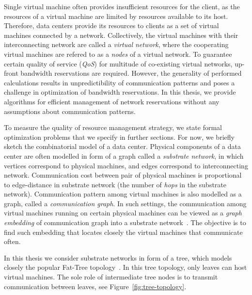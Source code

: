 Single virtual machine often provides insufficient resources for the client, as the resources of a virtual machine are limited by resources available to its host.
Therefore, data centers provide its resources to clients as a set
of virtual machines connected by a network.
Collectively, the virtual machines with their interconnecting network are called a \emph{virtual network}, where the cooperating virtual machines are refered to as a \emph{nodes} of a virtual network.
To guarantee certain quality of service (\emph{QoS}) for multitude of co-existing virtual networks, up-front bandwidth reservations are required.
However, the generality of performed calculations results in unpredictibility of communication patterns and poses a challenge in optimization of bandwidth reservations.
In this thesis, we provide algorithms for efficient management of network reservations without any assumptions about communication patterns.

To measure the quality of resource management strategy, we state formal optimization problems that we specify in further sections.
For now, we briefly sketch the combinatorial model of a data center.
Physical components of a data center are often modelled in form of a graph called a \emph{substrate network}, in which vertices correspond to physical machines, and edges correspond to interconnecting network.
Communication cost between pair of physical machines is proportional to edge-distance in substrate network (the number of \emph{hops} in the substrate network).
Communication pattern among virtual machines is also modelled as a graph, called a \emph{communication graph}.
In such settings, the communication among virtual machines running on certain physical machines can be viewed as a \emph{graph embedding} of communication graph into a substrate network~\cite{Goyal2008,gupta2001provisioning}.
The objective is to find such embedding that locates closely the virtual machines that communicate often.

In this thesis we consider substrate networks in form of a tree, which models closely the popular Fat-Tree topology~\cite{fat-trees}.
In this tree topology, only leaves can host virtual machines.
The sole role of intermediate tree nodes is to transmit communication between leaves, see Figure~\ref{fig:tree-topology}.


